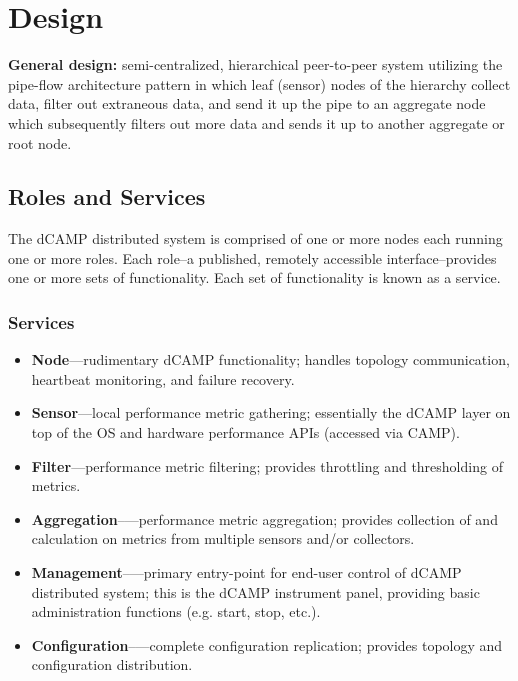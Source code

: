 \chapter{Design}
\label{design}

\textbf{General design:} semi-centralized, hierarchical peer-to-peer system utilizing the pipe-flow architecture pattern
in which leaf (sensor) nodes of the hierarchy collect data, filter out extraneous data, and send it up the pipe to an
aggregate node which subsequently filters out more data and sends it up to another aggregate or root node.

\section{\dcamp Roles and Services}

The dCAMP distributed system is comprised of one or more nodes each running one or more roles. Each role--a published,
remotely accessible interface--provides one or more sets of functionality. Each set of functionality is known as a
service.

\subsection{Services}

\begin{itemize}

\item \textbf{Node}---rudimentary dCAMP functionality; handles topology communication, heartbeat monitoring, and failure
recovery.

\item \textbf{Sensor}---local performance metric gathering; essentially the dCAMP layer on top of the OS and hardware
performance APIs (accessed via CAMP).

\item \textbf{Filter}---performance metric filtering; provides throttling and thresholding of metrics.

\item \textbf{Aggregation}--—performance metric aggregation; provides collection of and calculation on metrics from
multiple sensors and/or collectors.

\item \textbf{Management}--—primary entry-point for end-user control of dCAMP distributed system; this is the dCAMP
instrument panel, providing basic administration functions (e.g. start, stop, etc.).

\item \textbf{Configuration}--—complete configuration replication; provides topology and configuration distribution.

\end{itemize}

